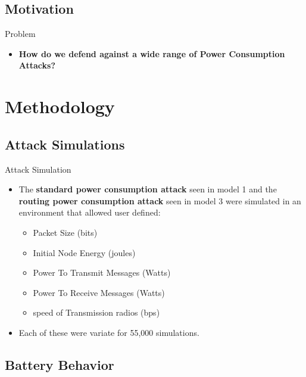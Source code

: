 \documentclass{beamer}
\begin{document}

\subsection{Motivation}

\begin{frame}{Problem}
\begin{itemize}

	\item \textbf{How do we defend against a wide range of Power Consumption Attacks?}
	
\end{itemize}
\end{frame}

\section{Methodology}

\subsection{Attack Simulations}

\begin{frame}{Attack Simulation}
	\begin{itemize}
	\item The \textbf{standard power consumption attack} seen in model 1 and the \textbf{routing power consumption attack} seen in model 3 were simulated in an environment that allowed user defined: 
	\begin{itemize}
		\item Packet Size (bits)
		\item Initial Node Energy (joules)
		\item Power To Transmit Messages (Watts)
		\item Power To Receive Messages (Watts)
		\item speed of Transmission radios (bps)
	\end{itemize}
	\item Each of these were variate for 55,000 simulations.
	
	\end{itemize}
\end{frame}

\subsection{Battery Behavior}
\end{document}

